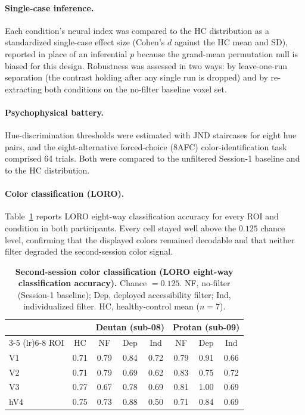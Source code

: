 \paragraph{Single-case inference.}
Each condition's neural index was compared to the HC distribution as a standardized single-case effect size (Cohen's $d$ against the HC mean and SD), reported in place of an inferential $p$ because the grand-mean permutation null is biased for this design. Robustness was assessed in two ways: by leave-one-run separation (the contrast holding after any single run is dropped) and by re-extracting both conditions on the no-filter baseline voxel set.

\paragraph{Psychophysical battery.}
Hue-discrimination thresholds were estimated with JND staircases for eight hue pairs, and the eight-alternative forced-choice (8AFC) color-identification task comprised 64 trials. Both were compared to the unfiltered Session-1 baseline and to the HC distribution.

\paragraph{Color classification (LORO).}
Table~\ref{tab:exp2_loro} reports LORO eight-way classification accuracy for every ROI and condition in both participants. Every cell stayed well above the $0.125$ chance level, confirming that the displayed colors remained decodable and that neither filter degraded the second-session color signal.

\begin{table}[tb]
  \centering
  \caption{\textbf{Second-session color classification (LORO eight-way classification accuracy).} Chance $= 0.125$. NF, no-filter (Session-1 baseline); Dep, deployed accessibility filter; Ind, individualized filter. HC, healthy-control mean ($n = 7$).}
  \label{tab:exp2_loro}
  \begin{tabular}{lccccccc}
    \toprule
     & & \multicolumn{3}{c}{Deutan (sub-08)} & \multicolumn{3}{c}{Protan (sub-09)} \\
    \cmidrule(lr){3-5} \cmidrule(lr){6-8}
    ROI & HC & NF & Dep & Ind & NF & Dep & Ind \\
    \midrule
    V1  & 0.71 & 0.79 & 0.84 & 0.72 & 0.79 & 0.91 & 0.66 \\
    V2  & 0.71 & 0.79 & 0.69 & 0.62 & 0.83 & 0.75 & 0.72 \\
    V3  & 0.77 & 0.67 & 0.78 & 0.69 & 0.81 & 1.00 & 0.69 \\
    hV4 & 0.75 & 0.73 & 0.88 & 0.50 & 0.71 & 0.84 & 0.69 \\
    \bottomrule
  \end{tabular}
\end{table}

